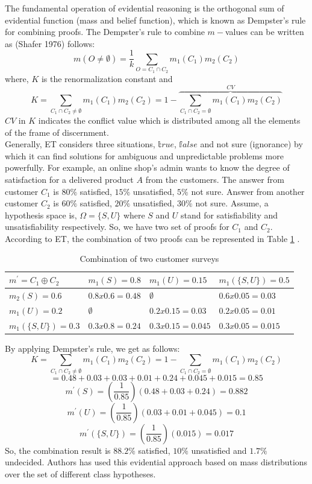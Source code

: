 The fundamental operation of evidential reasoning is the orthogonal sum of evidential function (mass and belief function), which is known as Dempster's rule for combining proofs\cite{Bell_4028391}. The Dempster's rule to combine $m-$values can be written as (Shafer 1976) follows\cite{srivastava2011introduction}:
 $$m(O \neq \emptyset) = \frac{1}{k}  \sum_{O=C_{1} \cap C_{2}} m_{1}(C_{1})m_{2}(C_{2})$$
where, $K$ is the renormalization constant and 
$$K = \sum_{C_{1} \cap C_{2} \neq \emptyset} m_{1}(C_{1})m_{2}(C_{2}) = 1-\overbrace{ \sum_{C_{1} \cap C_{2} = \emptyset} m_{1}(C_{1})m_{2}(C_{2})}^{CV}$$
$CV$ in $K$ indicates the conflict value which is distributed among all the elements of the frame of discernment\cite{Chavez_Garcia_2016}.\\
Generally, ET considers three situations, $\mathbb true$, $\mathbb false$ and not sure (ignorance) by which it can find solutions for ambiguous and unpredictable problems more powerfully. For example, an online shop's admin wants to know the degree of satisfaction for a delivered product $A$ from the customers. The answer from customer $C_{1}$ is $80\%$ satisfied, $15\%$ unsatisfied, $5\%$ not sure. Answer from another customer $C_{2}$ is $60\%$ satisfied, $20\%$ unsatisfied, $30\%$ not sure. Assume, a hypothesis space is, $\Omega = \{S, U\}$ where $S$ and $U$ stand for satisfiability and unsatisfiability respectively. So, we have two set of proofs for $C_{1}$ and $C_{2}$. According to ET, the combination of two proofs can be represented in Table \ref{table:customer_surv} \cite{Bell_4028391}.
\begin{table}[]
\centering
\caption{Combination of two customer surveys}
\label{table:customer_surv}
\begin{tabular}{|l|l|l|l|}
\hline
 $m^{\prime}=C_{1}\oplus C_{2}$&  $m_{1}(S)=0.8$ & $m_{1}(U)=0.15$ & $m_{1}(\{S, U\})=0.5$ \\ \hline
 $m_{2}(S)=0.6$& $0.8x0.6=0.48$ & $\emptyset$ & $0.6x0.05=0.03$ \\ \hline
 $m_{1}(U)=0.2$& $\emptyset$ & $0.2x0.15=0.03$ & $0.2x0.05=0.01$ \\ \hline
 $m_{1}(\{S, U\})=0.3$& $0.3x0.8=0.24$ & $0.3x0.15=0.045$ & $0.3x0.05=0.015$ \\ \hline
\end{tabular}
\end{table}
By applying Dempster's rule, we get as follows:
$$K = \sum_{C_{1} \cap C_{2} \neq \emptyset} m_{1}(C_{1})m_{2}(C_{2}) = 1- \sum_{C_{1} \cap C_{2} = \emptyset} m_{1}(C_{1})m_{2}(C_{2})$$
$$=0.48 + 0.03 + 0.03 + 0.01 + 0.24 + 0.045 + 0.015 = 0.85$$
$$m^{\prime}(S)=(\frac{1}{0.85})(0.48 + 0.03 + 0.24) = 0.882$$
$$m^{\prime}(U)=(\frac{1}{0.85})(0.03+0.01+0.045) = 0.1$$
$$m^{\prime}(\{S, U\})=(\frac{1}{0.85})(0.015) = 0.017$$
So, the combination result is $88.2\%$ satisfied, $10\%$ unsatisfied and $1.7\%$ undecided. Authors has used this evidential approach based on mass distributions over the set of different class hypotheses\cite{Chavez_Garcia_2016}.

